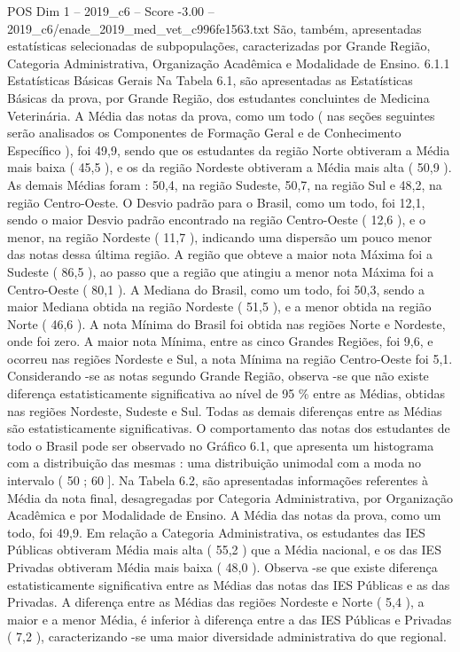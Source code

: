\begin{textsample}{POS Dim 1 – 2019\_c6 – Score -3.00 – 2019\_c6/enade\_2019\_med\_vet\_c996fe1563.txt}
São, também, apresentadas estatísticas selecionadas de subpopulações, caracterizadas por Grande Região, Categoria Administrativa, Organização Acadêmica e Modalidade de Ensino. 6.1.1 Estatísticas Básicas Gerais Na Tabela 6.1, são apresentadas as Estatísticas Básicas da prova, por Grande Região, dos estudantes concluintes de Medicina Veterinária.
A Média das notas da prova, como um todo ( nas seções seguintes serão analisados os Componentes de Formação Geral e de Conhecimento Específico ), foi 49,9, sendo que os estudantes da região Norte obtiveram a Média mais baixa ( 45,5 ), e os da região Nordeste obtiveram a Média mais alta ( 50,9 ).
As demais Médias foram : 50,4, na região Sudeste, 50,7, na região Sul e 48,2, na região Centro-Oeste.
O Desvio padrão para o Brasil, como um todo, foi 12,1, sendo o maior Desvio padrão encontrado na região Centro-Oeste ( 12,6 ), e o menor, na região Nordeste ( 11,7 ), indicando uma dispersão um pouco menor das notas dessa última região.
A região que obteve a maior nota Máxima foi a Sudeste ( 86,5 ), ao passo que a região que atingiu a menor nota Máxima foi a Centro-Oeste ( 80,1 ).
A Mediana do Brasil, como um todo, foi 50,3, sendo a maior Mediana obtida na região Nordeste ( 51,5 ), e a menor obtida na região Norte ( 46,6 ).
A nota Mínima do Brasil foi obtida nas regiões Norte e Nordeste, onde foi zero.
A maior nota Mínima, entre as cinco Grandes Regiões, foi 9,6, e ocorreu nas regiões Nordeste e Sul, a nota Mínima na região Centro-Oeste foi 5,1.
Considerando -se as notas segundo Grande Região, observa -se que não existe diferença estatisticamente significativa ao nível de 95 \% entre as Médias, obtidas nas regiões Nordeste, Sudeste e Sul.
Todas as demais diferenças entre as Médias são estatisticamente significativas.
O comportamento das notas dos estudantes de todo o Brasil pode ser observado no Gráfico 6.1, que apresenta um histograma com a distribuição das mesmas : uma distribuição unimodal com a moda no intervalo ( 50 ; 60 ].
Na Tabela 6.2, são apresentadas informações referentes à Média da nota final, desagregadas por Categoria Administrativa, por Organização Acadêmica e por Modalidade de Ensino.
A Média das notas da prova, como um todo, foi 49,9.
Em relação a Categoria Administrativa, os estudantes das IES Públicas obtiveram Média mais alta ( 55,2 ) que a Média nacional, e os das IES Privadas obtiveram Média mais baixa ( 48,0 ).
Observa -se que existe diferença estatisticamente significativa entre as Médias das notas das IES Públicas e as das Privadas.
A diferença entre as Médias das regiões Nordeste e Norte ( 5,4 ), a maior e a menor Média, é inferior à diferença entre a das IES Públicas e Privadas ( 7,2 ), caracterizando -se uma maior diversidade administrativa do que regional.

\end{textsample}
